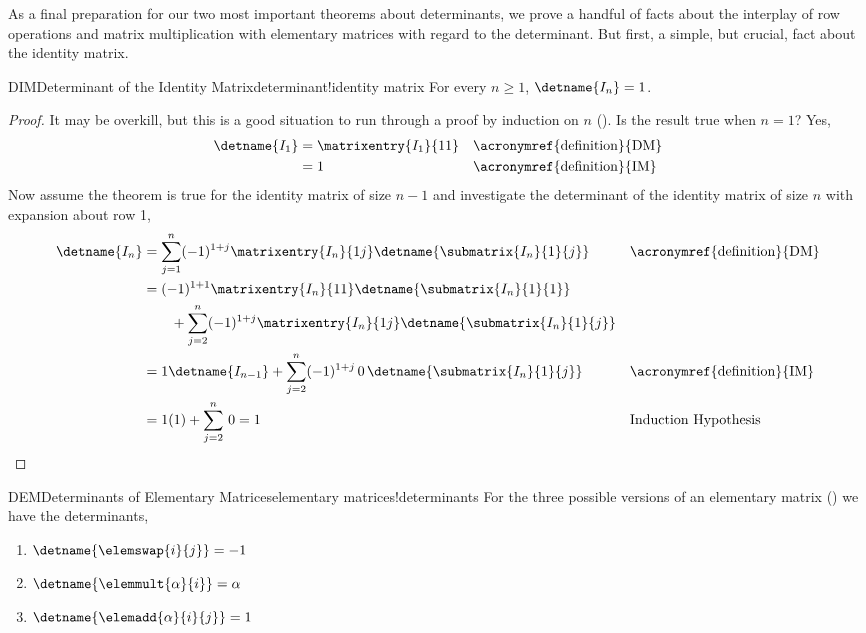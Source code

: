 %
%
As a final preparation for our two most important theorems about determinants, we prove a handful of facts about the interplay of row operations and matrix multiplication with elementary matrices with regard to the determinant.  But first, a simple, but crucial, fact about the identity matrix.
%
%
\begin{theorem}{DIM}{Determinant of the Identity Matrix}{determinant!identity matrix}
For every $n\geq 1$, $\detname{I_n}=1$.
\end{theorem}
%
\begin{proof}
It may be overkill, but this is a good situation to run through a proof by induction on $n$ ().  Is the result true when $n=1$? Yes, 
%
\begin{align*}
\detname{I_1}
&=\matrixentry{I_1}{11}&&\text{\acronymref{definition}{DM}}\\
%
&=1&&\text{\acronymref{definition}{IM}}\\
%
\end{align*}
%
Now assume the theorem is true for the identity matrix of size $n-1$ and investigate the determinant of the identity matrix of size $n$ with expansion about row 1,
%
\begin{align*}
\detname{I_n}
&=
\sum_{j=1}^{n}(-1)^{1+j}\matrixentry{I_n}{1j}\detname{\submatrix{I_n}{1}{j}}
&&\text{\acronymref{definition}{DM}}\\
%
&=
(-1)^{1+1}\matrixentry{I_n}{11}\detname{\submatrix{I_n}{1}{1}}\\
&\quad\quad+
\sum_{j=2}^{n}(-1)^{1+j}\matrixentry{I_n}{1j}\detname{\submatrix{I_n}{1}{j}}\\
%
&=
1\detname{I_{n-1}}+
\sum_{j=2}^{n}(-1)^{1+j}\,0\,\detname{\submatrix{I_n}{1}{j}}
&&\text{\acronymref{definition}{IM}}\\
%
&=
1(1)+\sum_{j=2}^{n}\,0=1
&&\text{Induction Hypothesis}\\
\end{align*}
%
\end{proof}
%
%
\begin{theorem}{DEM}{Determinants of Elementary Matrices}{elementary matrices!determinants}
For the three possible versions of an elementary matrix () we have the determinants,
\begin{enumerate}
\item $\detname{\elemswap{i}{j}}=-1$
\item $\detname{\elemmult{\alpha}{i}}=\alpha$
\item $\detname{\elemadd{\alpha}{i}{j}}=1$
\end{enumerate}
\end{theorem}

